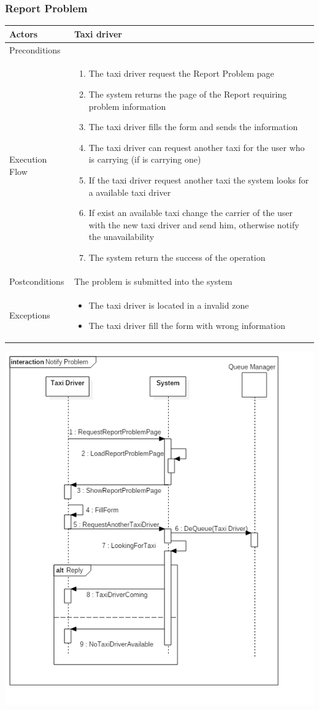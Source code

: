 \documentclass[english]{article}
\providecommand{\tabularnewline}{\\}
\begin{document}
\subsubsection{Report Problem}

\begin{tabular}{lp{8cm}}
\hline 
Actors  & Taxi driver \tabularnewline
\hline 
Preconditions  & \tabularnewline
\hline 
Execution Flow  & \begin{enumerate}
\item The taxi driver request the Report Problem page 
\item The system returns the page of the Report requiring problem information 
\item The taxi driver fills the form and sends the information 
\item The taxi driver can request another taxi for the user who is carrying
(if is carrying one) 
\item If the taxi driver request another taxi the system looks for a available
taxi driver 
\item If exist an available taxi change the carrier of the user with the
new taxi driver and send him, otherwise notify the unavailability 
\item The system return the success of the operation \end{enumerate}
\tabularnewline
\hline 
Postconditions  & The problem is submitted into the system \tabularnewline
\hline 
Exceptions  & \begin{itemize}
\item The taxi driver is located in a invalid zone 
\item The taxi driver fill the form with wrong information\end{itemize}
\tabularnewline
\end{tabular}

\includegraphics[width=\textwidth]{NotifyProblem}
\end{document}
